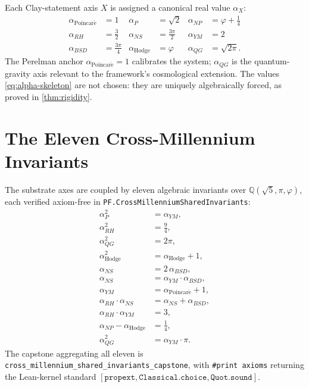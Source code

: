\documentclass[11pt,a4paper]{article}
\theoremstyle{definition}
\begin{document}
Each Clay-statement axis $X$ is assigned a canonical real value
$\alpha_X$:
\begin{equation}
\label{eq:alpha-skeleton}
\begin{aligned}
\alpha_{\mathrm{Poincar\acute{e}}} &= 1
& \alpha_P &= \sqrt{2}
& \alpha_{NP} &= \varphi + \tfrac{1}{4} \\
\alpha_{RH} &= \tfrac{3}{2}
& \alpha_{NS} &= \tfrac{3\pi}{2}
& \alpha_{YM} &= 2 \\
\alpha_{BSD} &= \tfrac{3\pi}{4}
& \alpha_{\mathrm{Hodge}} &= \varphi
& \alpha_{QG} &= \sqrt{2\pi}.
\end{aligned}
\end{equation}
The Perelman anchor $\alpha_{\mathrm{Poincar\acute{e}}} = 1$
calibrates the system; $\alpha_{QG}$ is the quantum-gravity axis
relevant to the framework's cosmological extension. The values
\eqref{eq:alpha-skeleton} are not chosen: they are uniquely
algebraically forced, as proved in \cref{thm:rigidity}.

\section{The Eleven Cross-Millennium Invariants}
\label{sec:invariants}

The substrate axes are coupled by eleven algebraic invariants over
$\mathbb{Q}(\sqrt{5}, \pi, \varphi)$, each verified axiom-free in
\texttt{PF.CrossMillenniumSharedInvariants}:
\begin{align}
\label{inv:1}  \alpha_P^2 &= \alpha_{YM}, \\
\label{inv:2}  \alpha_{RH}^2 &= \tfrac{9}{4}, \\
\label{inv:3}  \alpha_{QG}^2 &= 2\pi, \\
\label{inv:4}  \alpha_{\mathrm{Hodge}}^2 &= \alpha_{\mathrm{Hodge}} + 1, \\
\label{inv:5}  \alpha_{NS} &= 2\,\alpha_{BSD}, \\
\label{inv:6}  \alpha_{NS} &= \alpha_{YM} \cdot \alpha_{BSD}, \\
\label{inv:7}  \alpha_{YM} &= \alpha_{\mathrm{Poincar\acute{e}}} + 1, \\
\label{inv:8}  \alpha_{RH} \cdot \alpha_{NS} &= \alpha_{NS} + \alpha_{BSD}, \\
\label{inv:9}  \alpha_{RH} \cdot \alpha_{YM} &= 3, \\
\label{inv:10} \alpha_{NP} - \alpha_{\mathrm{Hodge}} &= \tfrac{1}{4}, \\
\label{inv:11} \alpha_{QG}^2 &= \alpha_{YM} \cdot \pi.
\end{align}
The capstone aggregating all eleven is
\texttt{cross\_millennium\_shared\_invariants\_capstone}, with
\verb|#print axioms| returning the Lean-kernel standard
$[\texttt{propext}, \texttt{Classical.choice}, \texttt{Quot.sound}]$.
\end{document}
